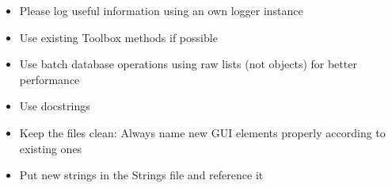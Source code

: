 \documentclass[letterpaper,10pt,english]{sphinxmanual}
\begin{document}
\begin{itemize}
\item {} 
Please log useful information using an own logger instance

\item {} 
Use existing Toolbox methods if possible

\item {} 
Use batch database operations using raw lists (not objects) for better performance

\item {} 
Use docstrings

\item {} 
Keep the  files clean: Always name new GUI elements properly according to existing ones

\item {} 
Put new strings in the Strings file and reference it

\end{itemize}
\end{document}
